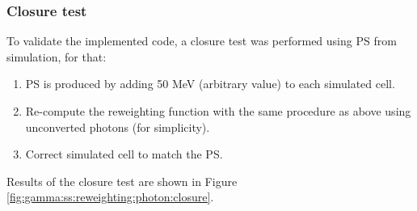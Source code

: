 \begin{figure}[htbp]
\end{figure}

\subsubsection{Closure test}
To validate the implemented code, a closure test was performed using PS from simulation, for that:
\begin{enumerate}
    \item PS is produced by adding 50 MeV (arbitrary value) to each simulated cell.
    \item Re-compute the reweighting function with the same procedure as above using unconverted photons (for simplicity).
    \item Correct simulated cell to match the PS.
\end{enumerate}
Results of the closure test are shown in Figure \ref{fig:gamma:ss:reweighting:photon:closure}. 
